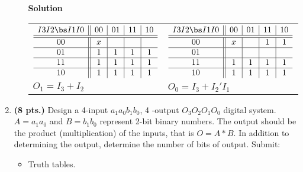 \begin{enumerate}
\begin{itemize}
\begin{onlysolution}  \textbf{Solution} \itshape{
\begin{tabular}{ll}
$ \begin{array} {c||c|c|c|c}
 I3 I2 \bs I1 I0 & 00 & 01 & 11 & 10 \\ \hline \hline
       00        & x  &    &    &    \\ \hline
       01        & 1  & 1  & 1  & 1  \\ \hline
       11        & 1  & 1  & 1  & 1  \\ \hline
       10        & 1  & 1  & 1  & 1  \\
\end{array} $ & 
$ \begin{array} {c||c|c|c|c}
 I3 I2 \bs I1 I0 & 00 & 01 & 11 & 10 \\ \hline \hline
       00        & x  &    & 1  & 1  \\ \hline
       01        &    &    &    &    \\ \hline
       11        & 1  & 1  & 1  & 1  \\ \hline
       10        & 1  & 1  & 1  & 1  \\
\end{array} $ \\
$O_1 = I_3 + I_2$ & $O_0=I_3 + I_2'I_1$ \\
\end{tabular}
} \end{onlysolution} 
\end{itemize}

\item \textbf{ (8 pts.)}
Design a 4-input $a_1 a_0 b_1 b_0$, 4 -output $O_3 O_2 O_1 O_0$
digital system.  $A=a_1 a_0$ and $B=b_1 b_0$ represent 2-bit binary
numbers.  The output should be the product (multiplication) of the inputs, 
that is $O = A*B$.  In addition to determining the output, determine the
number of bits of output. Submit:
\begin{itemize}
\item Truth tables.


\end{itemize}
\end{enumerate}
